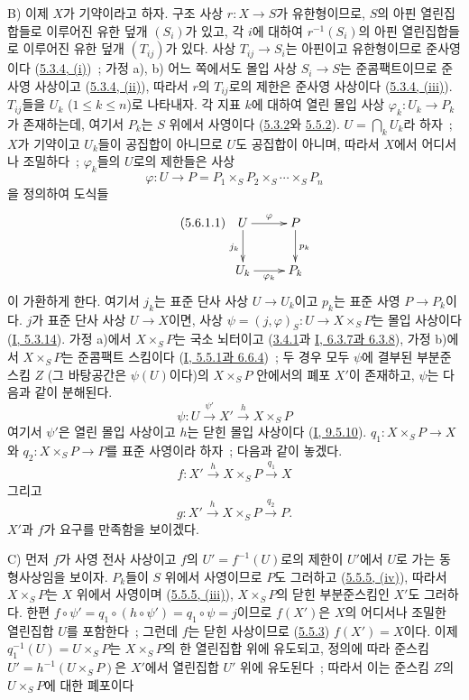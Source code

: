 B) 이제 $X$가 기약이라고 하자. 구조 사상 $r:X\to S$가 유한형이므로,
$S$의 아핀 열린집합들로 이루어진 유한 덮개 $(S_i)$가 있고, 각 $i$에
대하여 $r^{-1}(S_i)$의 아핀 열린집합들로 이루어진 유한 덮개
$(T_{ij})$가 있다. 사상 $T_{ij}\to S_i$는 아핀이고 유한형이므로
준사영이다 (\hyperref[II.5.3.4-ko]{5.3.4, (i)})~; 가정 a), b) 어느
쪽에서도 몰입 사상 $S_i\to S$는 준콤팩트이므로 준사영 사상이고
(\hyperref[II.5.3.4-ko]{5.3.4, (ii)}), 따라서 $r$의 $T_{ij}$로의 제한은
준사영 사상이다 (\hyperref[II.5.3.4-ko]{5.3.4, (iii)}). $T_{ij}$들을
$U_k$ ($1\leq k\leq n$)로 나타내자. 각 지표 $k$에 대하여 열린 몰입
사상 $\varphi_k:U_k\to P_k$가 존재하는데, 여기서 $P_k$는 $S$ 위에서
사영이다 (\hyperref[II.5.3.2-ko]{5.3.2}와
\hyperref[II.5.5.2-ko]{5.5.2}). $U=\bigcap_kU_k$라 하자~; $X$가
기약이고 $U_k$들이 공집합이 아니므로 $U$도 공집합이 아니며, 따라서
$X$에서 어디서나 조밀하다~; $\varphi_k$들의 $U$로의 제한들은 사상
\[
\varphi:U\to P=P_1\times_SP_2\times_S\cdots\times_SP_n
\]
을 정의하여 도식들
\[
\tag{5.6.1.1}
\label{II.5.6.1.1-ko}
\xymatrix{
U\ar[r]^\varphi\ar[d]_{j_k} & P\ar[d]^{p_k}\\
U_k\ar[r]_{\varphi_k} & P_k
}
\]
이 가환하게 한다. 여기서 $j_k$는 표준 단사 사상 $U\to U_k$이고
$p_k$는 표준 사영 $P\to P_k$이다. $j$가 표준 단사 사상 $U\to X$이면,
사상 $\psi=(j,\varphi)_S:U\to X\times_SP$는 몰입 사상이다
(\hyperref[I.5.3.14-ko]{I, 5.3.14}). 가정 a)에서 $X\times_SP$는 국소
뇌터이고 (\hyperref[II.3.4.1-ko]{3.4.1}과
\hyperref[I.6.3.7-ko]{I, 6.3.7과 6.3.8}), 가정 b)에서
$X\times_SP$는 준콤팩트 스킴이다
(\hyperref[I.5.5.1-ko]{I, 5.5.1과 6.6.4})~; 두 경우 모두 $\psi$에
결부된 부분준스킴 $Z$ (그 바탕공간은 $\psi(U)$이다)의
$X\times_SP$ 안에서의 폐포 $X'$이 존재하고, $\psi$는 다음과 같이
분해된다.
\[
\tag{5.6.1.2}
\label{II.5.6.1.2-ko}
\psi:U\xrightarrow{\psi'}X'\xrightarrow{h}X\times_SP
\]
여기서 $\psi'$은 열린 몰입 사상이고 $h$는 닫힌 몰입 사상이다
(\hyperref[I.9.5.10-ko]{I, 9.5.10}). $q_1:X\times_SP\to X$와
$q_2:X\times_SP\to P$를 표준 사영이라 하자~; 다음과 같이 놓겠다.
\[
\tag{5.6.1.3}
\label{II.5.6.1.3-ko}
f:X'\xrightarrow{h}X\times_SP\xrightarrow{q_1}X
\]
그리고
\[
\tag{5.6.1.4}
\label{II.5.6.1.4-ko}
g:X'\xrightarrow{h}X\times_SP\xrightarrow{q_2}P.
\]
$X'$과 $f$가 요구를 만족함을 보이겠다.

C) 먼저 $f$가 사영 전사 사상이고 $f$의 $U'=f^{-1}(U)$로의 제한이
$U'$에서 $U$로 가는 동형사상임을 보이자. $P_k$들이 $S$ 위에서
사영이므로 $P$도 그러하고 (\hyperref[II.5.5.5-ko]{5.5.5, (iv)}), 따라서
$X\times_SP$는 $X$ 위에서 사영이며
(\hyperref[II.5.5.5-ko]{5.5.5, (iii)}), $X\times_SP$의 닫힌
부분준스킴인 $X'$도 그러하다. 한편
$f\circ\psi'=q_1\circ(h\circ\psi')=q_1\circ\psi=j$이므로 $f(X')$은
$X$의 어디서나 조밀한 열린집합 $U$를 포함한다~; 그런데 $f$는 닫힌
사상이므로 (\hyperref[II.5.5.3-ko]{5.5.3}) $f(X')=X$이다. 이제
$q_1^{-1}(U)=U\times_SP$는 $X\times_SP$의 한 열린집합 위에 유도되고,
정의에 따라 준스킴 $U'=h^{-1}(U\times_SP)$은 $X'$에서 열린집합
$U'$ 위에 유도된다~; 따라서 이는 준스킴 $Z$의 $U\times_SP$에 대한
폐포이다

